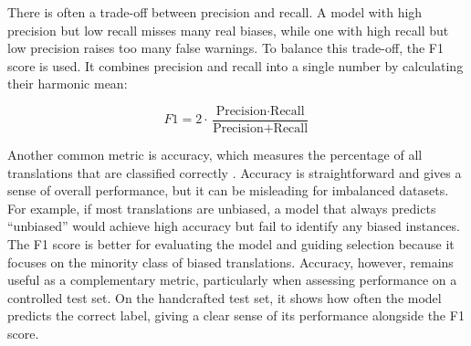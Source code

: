 There is often a trade-off between precision and recall. A model with high precision but low recall misses many real biases, while one with high recall but low precision raises too many false warnings. To balance this trade-off, the F1 score is used. It combines precision and recall into a single number by calculating their harmonic mean:

\vspace{0.4em}
\[
F1 = 2 \cdot \frac{\text{Precision} \cdot \text{Recall}}{\text{Precision} + \text{Recall}}
\]
\vspace{0.4em}

Another common metric is accuracy, which measures the percentage of all translations that are classified correctly \parencite{rainioEvaluationMetricsStatistical2024}. Accuracy is straightforward and gives a sense of overall performance, but it can be misleading for imbalanced datasets. For example, if most translations are unbiased, a model that always predicts “unbiased” would achieve high accuracy but fail to identify any biased instances. The F1 score is better for evaluating the model and guiding selection because it focuses on the minority class of biased translations. Accuracy, however, remains useful as a complementary metric, particularly when assessing performance on a controlled test set. On the handcrafted test set, it shows how often the model predicts the correct label, giving a clear sense of its performance alongside the F1 score.